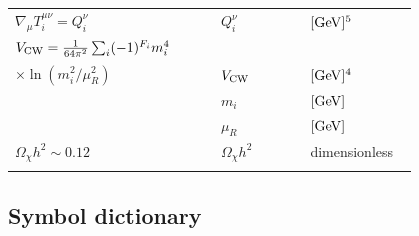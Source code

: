 \documentclass[epj]{svjour}
\begin{document}
\begin{table}[htbp]
\begin{tabular}{@{}>{\raggedright\arraybackslash}p{0.46\linewidth}>{\raggedright\arraybackslash}p{0.20\linewidth}>{\raggedright\arraybackslash}p{0.24\linewidth}@{}}
\noalign{\smallskip}\hline\noalign{\smallskip}
\(\nabla_\mu T^{\mu\nu}_i = Q_i^\nu\) & \(Q_i^\nu\) & \([{\rm GeV}]^5\) \\
\noalign{\smallskip}\hline\noalign{\smallskip}
\(V_{\rm CW} = \frac{1}{64\pi^2}\sum_i (-1)^{F_i} m_i^4\) \\ \(\times \ln(m_i^2/\mu_R^2)\) & \(V_{\rm CW}\) & \([{\rm GeV}]^4\) \\
& \(m_i\) & \([{\rm GeV}]\) \\
& \(\mu_R\) & \([{\rm GeV}]\) \\
\noalign{\smallskip}\hline\noalign{\smallskip}
\(\Omega_\chi h^2 \sim 0.12\) & \(\Omega_\chi h^2\) & dimensionless \\
\noalign{\smallskip}\hline
\end{tabular}
\end{table}

\subsection{Symbol dictionary}
\end{document}
